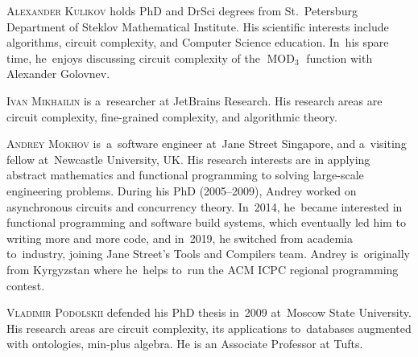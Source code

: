 \documentclass{toc}
\begin{document}
\begin{tocaboutauthors}
\begin{tocabout}[kulikov]
  \textsc{Alexander Kulikov}  %
  holds PhD and DrSci degrees from St.~Petersburg Department of Steklov Mathematical Institute. His scientific interests include algorithms, circuit complexity, and Computer Science education. In~his spare time, he~enjoys discussing circuit complexity of the $\operatorname{MOD}_3$ function with Alexander Golovnev.
\end{tocabout}
\begin{tocabout}[mikhailin]
  \textsc{Ivan Mikhailin}    %
  is a~researcher at JetBrains Research. 
  His research areas are circuit complexity,
  fine-grained complexity, and algorithmic theory.
\end{tocabout}
\begin{tocabout}[mokhov]
  \textsc{Andrey Mokhov}    %
  is~a~software engineer at~Jane Street Singapore, and 
  a~visiting fellow at~Newcastle University, UK. His research interests are in 
  applying abstract mathematics and functional programming to solving large-scale engineering problems. During his PhD (2005--2009), Andrey worked 
  on asynchronous circuits and concurrency theory. In~2014, he~became interested in functional programming and software build systems, which 
  eventually led him to writing more and more code, and in~2019, he switched from academia to~industry, joining Jane Street's Tools and Compilers 
  team. Andrey is~originally from Kyrgyzstan where he~helps to~run the ACM ICPC regional programming contest.
\end{tocabout}
\begin{tocabout}[podolskii]
  \textsc{Vladimir Podolskii}   %
  defended his PhD thesis in~2009 at~Moscow State University. His research areas are circuit complexity, its applications to~databases augmented with ontologies, min-plus algebra. He is an Associate Professor at Tufts.
\end{tocabout}
\end{tocaboutauthors}
\end{document}
